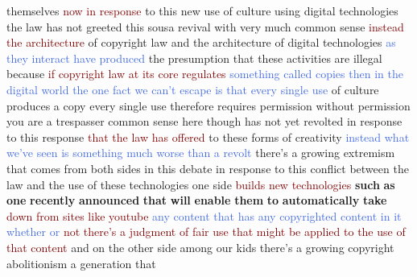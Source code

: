 themselves \textcolor{Maroon}{now} \textcolor{Maroon}{in} \textcolor{Maroon}{response} to this new use of culture using digital technologies the law has not greeted this sousa revival with very much common sense \textcolor{Maroon}{instead} \textcolor{Maroon}{the} \textcolor{Maroon}{architecture} of copyright law and the architecture of digital technologies \textcolor{RoyalBlue}{as} \textcolor{RoyalBlue}{they} \textcolor{RoyalBlue}{interact} \textcolor{RoyalBlue}{have} \textcolor{RoyalBlue}{produced} the presumption that these activities are illegal because \textcolor{Maroon}{if} \textcolor{Maroon}{copyright} \textcolor{Maroon}{law} \textcolor{Maroon}{at} \textcolor{Maroon}{its} \textcolor{Maroon}{core} \textcolor{Maroon}{regulates} \textcolor{RoyalBlue}{something} \textcolor{RoyalBlue}{called} \textcolor{RoyalBlue}{copies} \textcolor{RoyalBlue}{then} \textcolor{RoyalBlue}{in} \textcolor{RoyalBlue}{the} \textcolor{RoyalBlue}{digital} \textcolor{RoyalBlue}{world} \textcolor{RoyalBlue}{the} \textcolor{RoyalBlue}{one} \textcolor{RoyalBlue}{fact} \textcolor{RoyalBlue}{we} \textcolor{RoyalBlue}{can't} \textcolor{RoyalBlue}{escape} \textcolor{RoyalBlue}{is} \textcolor{RoyalBlue}{that} \textcolor{RoyalBlue}{every} \textcolor{RoyalBlue}{single} \textcolor{RoyalBlue}{use} of culture produces a copy every single use therefore requires permission without permission you are a trespasser common sense here though has not yet revolted in response to this response \textcolor{Maroon}{that} \textcolor{Maroon}{the} \textcolor{Maroon}{law} \textcolor{Maroon}{has} \textcolor{Maroon}{offered} to these forms of creativity \textcolor{RoyalBlue}{instead} \textcolor{RoyalBlue}{what} \textcolor{RoyalBlue}{we've} \textcolor{RoyalBlue}{seen} \textcolor{RoyalBlue}{is} \textcolor{RoyalBlue}{something} \textcolor{RoyalBlue}{much} \textcolor{RoyalBlue}{worse} \textcolor{RoyalBlue}{than} \textcolor{RoyalBlue}{a} \textcolor{RoyalBlue}{revolt} there's a growing extremism that comes from both sides in this debate in response to this conflict between the law and the use of these technologies one side \textcolor{Maroon}{builds} \textcolor{Maroon}{new} \textcolor{Maroon}{technologies} \textbf{such} \textbf{as} \textbf{one} \textbf{recently} \textbf{announced} \textbf{that} \textbf{will} \textbf{enable} \textbf{them} \textbf{to} \textbf{automatically} \textbf{take} \textcolor{Maroon}{down} \textcolor{Maroon}{from} \textcolor{Maroon}{sites} \textcolor{Maroon}{like} \textcolor{Maroon}{youtube} \textcolor{RoyalBlue}{any} \textcolor{RoyalBlue}{content} \textcolor{RoyalBlue}{that} \textcolor{RoyalBlue}{has} \textcolor{RoyalBlue}{any} \textcolor{RoyalBlue}{copyrighted} \textcolor{RoyalBlue}{content} \textcolor{RoyalBlue}{in} \textcolor{RoyalBlue}{it} \textcolor{RoyalBlue}{whether} \textcolor{RoyalBlue}{or} \textcolor{Maroon}{not} \textcolor{Maroon}{there's} \textcolor{Maroon}{a} \textcolor{Maroon}{judgment} \textcolor{Maroon}{of} \textcolor{Maroon}{fair} \textcolor{Maroon}{use} \textcolor{Maroon}{that} \textcolor{Maroon}{might} \textcolor{Maroon}{be} \textcolor{Maroon}{applied} \textcolor{Maroon}{to} \textcolor{Maroon}{the} \textcolor{Maroon}{use} \textcolor{Maroon}{of} \textcolor{Maroon}{that} \textcolor{Maroon}{content} and on the other side among our kids there's a growing copyright abolitionism a generation that 